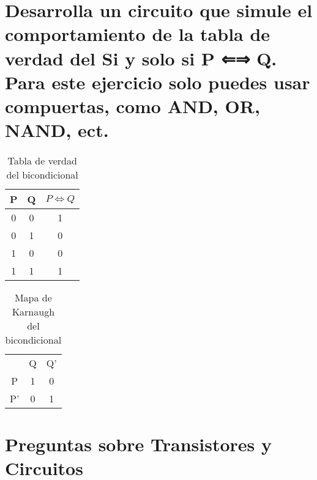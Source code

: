 \documentclass{article}
\begin{document}



\section*{Desarrolla un circuito que simule el comportamiento de la tabla de verdad del Si y solo si P ⇐⇒ Q. Para este ejercicio solo puedes usar compuertas, como AND, OR, NAND, ect.}


\begin{table}[h]
\centering
\begin{tabular}{cc|c}
\hline
P & Q & \( P \Leftrightarrow Q \) \\
\hline
0 & 0 & 1 \\
0 & 1 & 0 \\
1 & 0 & 0 \\
1 & 1 & 1 \\
\hline
\end{tabular}
\caption{Tabla de verdad del bicondicional}
\label{tab:truth_table_biconditional}
\end{table}

\begin{table}[h]
\centering
\begin{tabular}{c|c|c}
\multicolumn{1}{r}{} & \multicolumn{1}{c}{Q} & \multicolumn{1}{c}{Q'} \\ \cline{2-3}
P  & 1 & 0 \\ \cline{2-3}
P' & 0 & 1 \\ \cline{2-3}
\end{tabular}
\caption{Mapa de Karnaugh del bicondicional}
\label{tab:kmap_biconditional}
\end{table}


\section*{Preguntas sobre Transistores y Circuitos}
\end{document}
